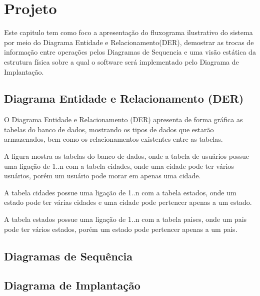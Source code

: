 \chapter{Projeto}

Este capitulo tem como foco a apresentação do fluxograma ilustrativo do sistema por meio do Diagrama Entidade e Relacionamento(DER), demostrar as trocas de informação entre operações pelos Diagramas de Sequencia e uma visão estática da estrutura física sobre a qual o software será implementado pelo Diagrama de Implantação.

\section{Diagrama Entidade e Relacionamento (DER)}

O Diagrama Entidade e Relacionamento (DER) apresenta de forma gráfica as tabelas do banco de dados, mostrando os tipos de dados que estarão armazenados, bem como os relacionamentos existentes entre as tabelas.

A figura mostra as tabelas do banco de dados, onde a tabela de usuários possue uma ligação de 1..n com a tabela cidades, onde uma cidade pode ter vários usuários, porém um usuário pode morar em apenas uma cidade.

A tabela cidades possue uma ligação de 1..n com a tabela estados, onde um estado pode ter várias cidades e uma cidade pode pertencer apenas a um estado.

A tabela estados possue uma ligação de 1..n com a tabela paises, onde um pais pode ter vários estados, porém um estado pode pertencer apenas a um pais. 



\section{Diagramas de Sequência}

\section{Diagrama de Implantação}
